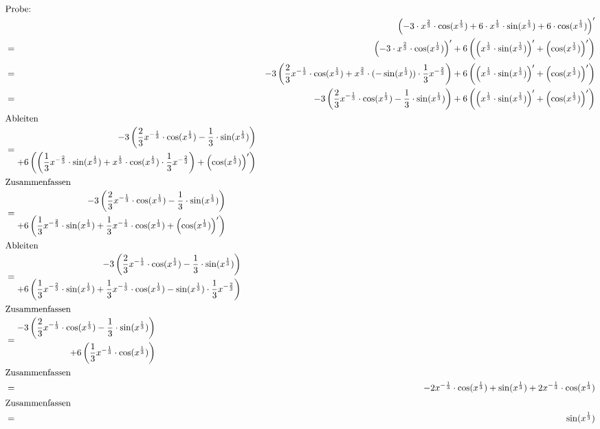 \documentclass[10pt,a4paper,oneside,ngerman,numbers=noenddot]{scrartcl}
\begin{document}
\begin{alignat*}{2}
\intertext{Probe:}
&& \left(-3 \cdot x^{\frac{2}{3}} \cdot \cos(x^{\frac{1}{3}}) + 6 \cdot x^{\frac{1}{3}} \cdot \sin(x^{\frac{1}{3}}) + 6 \cdot \cos(x^{\frac{1}{3}})\right)' \\
&=& \left(-3 \cdot x^{\frac{2}{3}} \cdot \cos(x^{\frac{1}{3}})\right)' + 6\left(\left(x^{\frac{1}{3}} \cdot \sin(x^{\frac{1}{3}})\right)' + \left(\cos(x^{\frac{1}{3}})\right)'\right) \\
&=& -3\left(\frac{2}{3}x^{-\frac{1}{3}} \cdot \cos(x^{\frac{1}{3}}) + x^{\frac{2}{3}} \cdot (-\sin(x^{\frac{1}{3}})) \cdot \frac{1}{3}x^{-\frac{2}{3}}\right)+ 6\left(\left(x^{\frac{1}{3}} \cdot \sin(x^{\frac{1}{3}})\right)' + \left(\cos(x^{\frac{1}{3}})\right)'\right) \\
&=& -3\left(\frac{2}{3}x^{-\frac{1}{3}} \cdot \cos(x^{\frac{1}{3}}) - \frac{1}{3} \cdot \sin(x^{\frac{1}{3}})\right)+ 6\left(\left(x^{\frac{1}{3}} \cdot \sin(x^{\frac{1}{3}})\right)' + \left(\cos(x^{\frac{1}{3}})\right)'\right) \\
\intertext{Ableiten}
&= \begin{split}-3\left(\frac{2}{3}x^{-\frac{1}{3}} \cdot \cos(x^{\frac{1}{3}}) - \frac{1}{3} \cdot \sin(x^{\frac{1}{3}})\right)\\ + 6\left(\left(\frac{1}{3}x^{-\frac{2}{3}} \cdot \sin(x^{\frac{1}{3}}) + x^{\frac{1}{3}} \cdot \cos(x^{\frac{1}{3}}) \cdot \frac{1}{3}x^{-\frac{2}{3}} \right) + \left(\cos(x^{\frac{1}{3}})\right)'\right) \end{split} \\
\intertext{Zusammenfassen}
&= \begin{split}-3\left(\frac{2}{3}x^{-\frac{1}{3}} \cdot \cos(x^{\frac{1}{3}}) - \frac{1}{3} \cdot \sin(x^{\frac{1}{3}})\right)\\ + 6\left(\frac{1}{3}x^{-\frac{2}{3}} \cdot \sin(x^{\frac{1}{3}}) + \frac{1}{3}x^{-\frac{1}{3}} \cdot \cos(x^{\frac{1}{3}}) + \left(\cos(x^{\frac{1}{3}})\right)'\right) \end{split} \\
\intertext{Ableiten}
&= \begin{split}-3\left(\frac{2}{3}x^{-\frac{1}{3}} \cdot \cos(x^{\frac{1}{3}}) - \frac{1}{3} \cdot \sin(x^{\frac{1}{3}})\right)\\ + 6\left(\frac{1}{3}x^{-\frac{2}{3}} \cdot \sin(x^{\frac{1}{3}}) + \frac{1}{3}x^{-\frac{1}{3}} \cdot \cos(x^{\frac{1}{3}}) - \sin(x^{\frac{1}{3}}) \cdot \frac{1}{3}x^{-\frac{2}{3}} \right) \end{split} \\
\intertext{Zusammenfassen}
&= \begin{split}-3\left(\frac{2}{3}x^{-\frac{1}{3}} \cdot \cos(x^{\frac{1}{3}}) - \frac{1}{3} \cdot \sin(x^{\frac{1}{3}})\right)\\ + 6\left(\frac{1}{3}x^{-\frac{1}{3}} \cdot \cos(x^{\frac{1}{3}})\right) \end{split} \\
\intertext{Zusammenfassen}
&=& -2x^{-\frac{1}{3}} \cdot \cos(x^{\frac{1}{3}}) + \sin(x^{\frac{1}{3}}) + 2x^{-\frac{1}{3}} \cdot \cos(x^{\frac{1}{3}}) \\
\intertext{Zusammenfassen}
&=& \sin(x^{\frac{1}{3}})
\end{alignat*}
\end{document}
